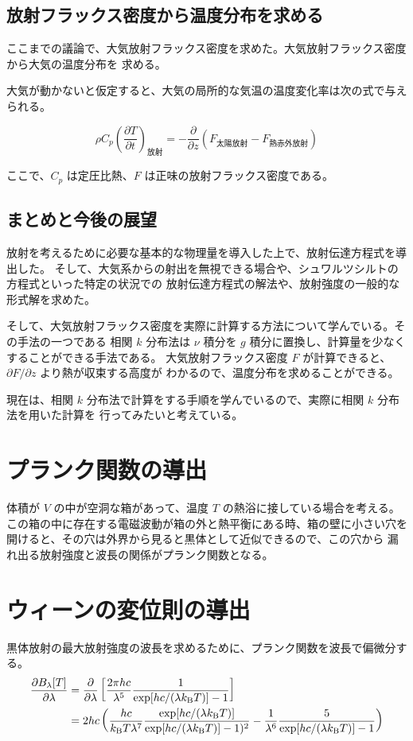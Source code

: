 \documentclass[book]{dennou777}
\begin{document}
\section{放射フラックス密度から温度分布を求める}
ここまでの議論で、大気放射フラックス密度を求めた。大気放射フラックス密度から大気の温度分布を
求める。

大気が動かないと仮定すると、大気の局所的な気温の温度変化率は次の式で与えられる。

\begin{equation}
	\rho C_p\left(\frac{\partial T}{\partial t}\right)_\text{放射}
	=-\frac{\partial}{\partial z}(F_\text{太陽放射}-F_\text{熱赤外放射})
\end{equation}

ここで、\(C_p\) は定圧比熱、\(F\) は正味の放射フラックス密度である。

\section{まとめと今後の展望}

放射を考えるために必要な基本的な物理量を導入した上で、放射伝達方程式を導出した。
そして、大気系からの射出を無視できる場合や、シュワルツシルトの方程式といった特定の状況での
放射伝達方程式の解法や、放射強度の一般的な形式解を求めた。

そして、大気放射フラックス密度を実際に計算する方法について学んでいる。その手法の一つである
相関 \(k\) 分布法は \(\nu\) 積分を \(g\) 積分に置換し、計算量を少なくすることができる手法である。
大気放射フラックス密度 \(F\) が計算できると、\(\partial F/\partial z\) より熱が収束する高度が
わかるので、温度分布を求めることができる。

現在は、相関 \(k\) 分布法で計算をする手順を学んでいるので、実際に相関 \(k\) 分布法を用いた計算を
行ってみたいと考えている。

\clearpage
\appendix
\chapter{プランク関数の導出}
体積が \(V\) の中が空洞な箱があって、温度 \(T\) の熱浴に接している場合を考える。
この箱の中に存在する電磁波動が箱の外と熱平衡にある時、箱の壁に小さい穴を
開けると、その穴は外界から見ると黒体として近似できるので、この穴から
漏れ出る放射強度と波長の関係がプランク関数となる。

\chapter{ウィーンの変位則の導出}
黒体放射の最大放射強度の波長を求めるために、プランク関数を波長で偏微分する。
\begin{align}
	\frac{\partial B_\lambda[T]}{\partial\lambda}
	&=\frac{\partial}{\partial\lambda}\left[\frac{2\pi hc}{\lambda^5}
		\frac{1}{\exp[hc/(\lambda k_\mathrm{B}T)]-1}\right]\notag\\
	&=2hc\left(\frac{hc}{k_\mathrm{B}T\lambda^7}
		\frac{\exp[hc/(\lambda k_\mathrm{B}T)]}{\exp[hc/(\lambda k_\mathrm{B}T)]-1)^2}
		-\frac{1}{\lambda^6}\frac{5}{\exp[hc/(\lambda k_\mathrm{B}T)]-1}\right)\label{dbdl}
\end{align}
\end{document}
